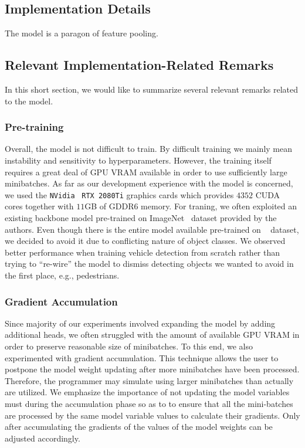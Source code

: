 \subsection{Implementation Details}

The \siammot{} model is a paragon of feature pooling.

\subsection{Relevant Implementation-Related Remarks}

In this short section, we would like to summarize several relevant remarks related to the \siammot{} model. 

\subsubsection{Pre-training}

Overall, the model is not difficult to train. By difficult training we mainly mean instability and sensitivity to hyperparameters. However, the training itself requires a great deal of GPU VRAM available in order to use sufficiently large minibatches. As far as our development experience with the \siammot{} model is concerned, we used the \texttt{NVidia}~\cite{webnvidia} \texttt{RTX 2080Ti} graphics cards which provides $4352$ CUDA cores together with $11$GB of GDDR6 memory. For traning, we often exploited an existing backbone model pre-trained on ImageNet~\cite{deng2009imagenet} dataset provided by the authors. Even though there is the entire model available pre-trained on \mscoco{}~\cite{lin2014mscoco} dataset, we decided to avoid it due to conflicting nature of object classes. We observed better performance when training vehicle detection from scratch rather than trying to ``re-wire'' the model to dismiss detecting objects we wanted to avoid in the first place, e.g., pedestrians.

\subsubsection{Gradient Accumulation}

Since majority of our experiments involved expanding the model by adding additional heads, we often struggled with the amount of available GPU VRAM in order to preserve reasonable size of minibatches. To this end, we also experimented with gradient accumulation. This technique allows the user to postpone the model weight updating after more minibatches have been processed. Therefore, the programmer may simulate using larger minibatches than actually are utilized. We emphasize the importance of not updating the model variables must during the accumulation phase so as to to ensure that all the mini-batches are processed by the same model variable values to calculate their gradients. Only after accumulating the gradients of the values of the model weights can be adjusted accordingly.

